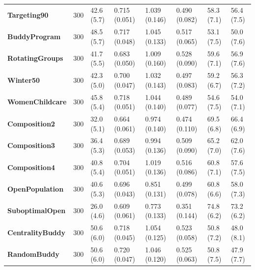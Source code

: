 \begin{table}[!h]
{\begin{tabular}[t]{>{}lrllllll}
\textbf{Targeting90} & 300 & 42.6 (5.7) & 0.715 (0.051) & 1.039 (0.146) & 0.490 (0.082) & 58.3 (7.1) & 56.4 (7.5)\\
\textbf{BuddyProgram} & 300 & 48.5 (5.7) & 0.717 (0.048) & 1.045 (0.133) & 0.517 (0.065) & 53.1 (7.5) & 50.0 (7.6)\\
\textbf{RotatingGroups} & 300 & 41.7 (5.5) & 0.683 (0.050) & 1.009 (0.160) & 0.528 (0.090) & 59.6 (7.1) & 56.9 (7.6)\\
\textbf{Winter50} & 300 & 42.3 (5.0) & 0.700 (0.047) & 1.032 (0.143) & 0.497 (0.083) & 59.2 (6.7) & 56.3 (7.2)\\
\addlinespace
\textbf{WomenChildcare} & 300 & 45.8 (5.4) & 0.718 (0.051) & 1.044 (0.140) & 0.489 (0.077) & 54.6 (7.5) & 54.0 (7.1)\\
\textbf{Composition2} & 300 & 32.0 (5.1) & 0.664 (0.061) & 0.974 (0.140) & 0.474 (0.110) & 69.5 (6.8) & 66.4 (6.9)\\
\textbf{Composition3} & 300 & 36.4 (5.3) & 0.689 (0.053) & 0.994 (0.136) & 0.509 (0.090) & 65.2 (7.0) & 62.0 (7.6)\\
\textbf{Composition4} & 300 & 40.8 (5.4) & 0.704 (0.051) & 1.019 (0.136) & 0.516 (0.086) & 60.8 (7.1) & 57.6 (7.5)\\
\textbf{OpenPopulation} & 300 & 40.6 (5.3) & 0.696 (0.043) & 0.851 (0.131) & 0.499 (0.078) & 60.8 (6.6) & 58.0 (7.3)\\
\addlinespace
\textbf{SuboptimalOpen} & 300 & 26.0 (4.6) & 0.609 (0.061) & 0.773 (0.133) & 0.351 (0.144) & 74.8 (6.2) & 73.2 (6.2)\\
\textbf{CentralityBuddy} & 300 & 50.6 (6.0) & 0.718 (0.045) & 1.054 (0.125) & 0.523 (0.058) & 50.8 (7.2) & 48.0 (8.1)\\
\textbf{RandomBuddy} & 300 & 50.6 (6.0) & 0.720 (0.047) & 1.046 (0.120) & 0.525 (0.063) & 50.8 (7.5) & 47.9 (7.7)\\
\bottomrule
\end{tabular}}
\end{table}
